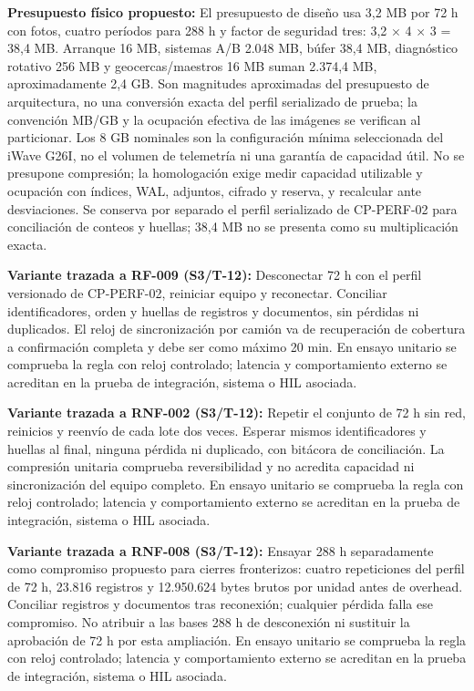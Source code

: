 \par\noindent\textbf{Presupuesto físico propuesto:} El presupuesto de diseño usa 3,2 MB por 72 h con fotos, cuatro períodos para 288 h y factor de seguridad tres: 3,2 \(\times\) 4 \(\times\) 3 = 38,4 MB. Arranque 16 MB, sistemas A/B 2.048 MB, búfer 38,4 MB, diagnóstico rotativo 256 MB y geocercas/maestros 16 MB suman 2.374,4 MB, aproximadamente 2,4 GB. Son magnitudes aproximadas del presupuesto de arquitectura, no una conversión exacta del perfil serializado de prueba; la convención MB/GB y la ocupación efectiva de las imágenes se verifican al particionar. Los 8 GB nominales son la configuración mínima seleccionada del iWave G26I, no el volumen de telemetría ni una garantía de capacidad útil. No se presupone compresión; la homologación exige medir capacidad utilizable y ocupación con índices, WAL, adjuntos, cifrado y reserva, y recalcular ante desviaciones. Se conserva por separado el perfil serializado de CP-PERF-02 para conciliación de conteos y huellas; 38,4 MB no se presenta como su multiplicación exacta.\par

\par\noindent\textbf{Variante trazada a RF-009 (S3/T-12):} Desconectar 72 h con el perfil versionado de CP-PERF-02, reiniciar equipo y reconectar. Conciliar identificadores, orden y huellas de registros y documentos, sin pérdidas ni duplicados. El reloj de sincronización por camión va de recuperación de cobertura a confirmación completa y debe ser como máximo 20 min. En ensayo unitario se comprueba la regla con reloj controlado; latencia y comportamiento externo se acreditan en la prueba de integración, sistema o HIL asociada.\par

\par\noindent\textbf{Variante trazada a RNF-002 (S3/T-12):} Repetir el conjunto de 72 h sin red, reinicios y reenvío de cada lote dos veces. Esperar mismos identificadores y huellas al final, ninguna pérdida ni duplicado, con bitácora de conciliación. La compresión unitaria comprueba reversibilidad y no acredita capacidad ni sincronización del equipo completo. En ensayo unitario se comprueba la regla con reloj controlado; latencia y comportamiento externo se acreditan en la prueba de integración, sistema o HIL asociada.\par

\par\noindent\textbf{Variante trazada a RNF-008 (S3/T-12):} Ensayar 288 h separadamente como compromiso propuesto para cierres fronterizos: cuatro repeticiones del perfil de 72 h, 23.816 registros y 12.950.624 bytes brutos por unidad antes de overhead. Conciliar registros y documentos tras reconexión; cualquier pérdida falla ese compromiso. No atribuir a las bases 288 h de desconexión ni sustituir la aprobación de 72 h por esta ampliación. En ensayo unitario se comprueba la regla con reloj controlado; latencia y comportamiento externo se acreditan en la prueba de integración, sistema o HIL asociada.\par


